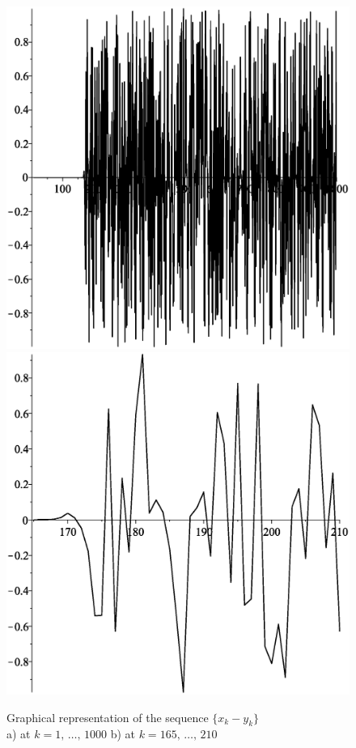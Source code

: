 \documentclass[12pt,a4paper]{amsart}
\begin{document}
\begin{figure}[h!]
\centering
\includegraphics[scale=0.28]{Fig2a}
\hspace{1cm}
\includegraphics[scale=0.28]{Fig2b}
\caption{Graphical representation of the sequence $\{x_k-y_k\}$ \\\centering 
a) at $k=1,\,\ldots,\,1000$ \hspace{1cm}
b) at $k=165,\,\ldots,\,210$} \label{f2}
\end{figure}
\end{document}
